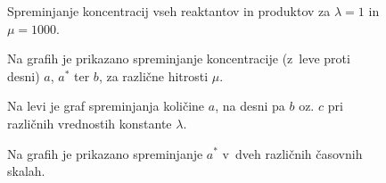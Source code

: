 \documentclass[a4paper,pdftex,12pt]{article}
\numberwithin{figure}{section} %
\begin{document}
\begin{figure}    
    \resizebox{0.98\linewidth}{!}{}
    \caption{Spreminjanje koncentracij vseh reaktantov in produktov za $\lambda=1$ in $\mu =
    1000$.}
    \label{slika1}
\end{figure}
\begin{figure}    
    \resizebox{0.98\linewidth}{!}{}
    \caption{Na grafih je prikazano spreminjanje koncentracije (z~leve proti desni) $a$, 
    $a^*$ ter $b$, za različne hitrosti $\mu$.}
    \label{slika7}
\end{figure}

\begin{figure}    
    \resizebox{0.98\linewidth}{!}{}
    \caption{Na levi je graf spreminjanja količine $a$, na desni pa $b$ oz. $c$ pri 
    različnih vrednostih konstante $\lambda$.}
    \label{slika2}
\end{figure}
\begin{figure}    
    \resizebox{0.98\linewidth}{!}{}
    \caption{Na grafih je prikazano spreminjanje $a^*$ v~dveh različnih časovnih skalah.}
    \label{slika3}
\end{figure}
\end{document}
